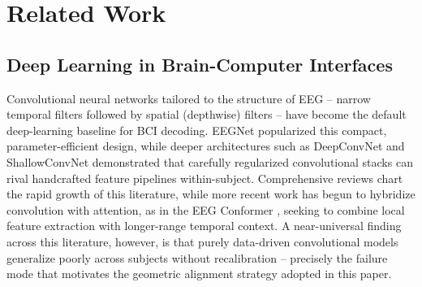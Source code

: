\documentclass[journal]{IEEEtran}
\begin{document}
\section{Related Work}
\label{sec:related}

\subsection{Deep Learning in Brain-Computer Interfaces}
Convolutional neural networks tailored to the structure of EEG -- narrow temporal filters followed by spatial (depthwise) filters -- have become the default deep-learning baseline for BCI decoding. EEGNet \cite{lawhern2018eegnet} popularized this compact, parameter-efficient design, while deeper architectures such as DeepConvNet and ShallowConvNet \cite{schirrmeister2017deep} demonstrated that carefully regularized convolutional stacks can rival handcrafted feature pipelines within-subject. Comprehensive reviews \cite{craik2019deep,roy2019deep,lotte2018review} chart the rapid growth of this literature, while more recent work has begun to hybridize convolution with attention, as in the EEG Conformer \cite{song2022eeg}, seeking to combine local feature extraction with longer-range temporal context. A near-universal finding across this literature, however, is that purely data-driven convolutional models generalize poorly across subjects without recalibration \cite{wu2022transfer} -- precisely the failure mode that motivates the geometric alignment strategy adopted in this paper.
\end{document}
